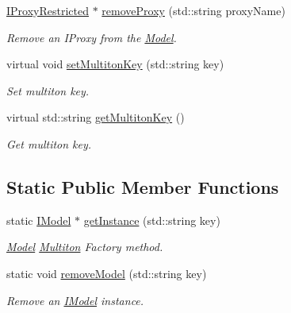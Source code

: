 \begin{DoxyCompactItemize}
\hyperlink{class_pure_m_v_c_1_1_i_proxy_restricted}{IProxyRestricted} $\ast$ \hyperlink{class_pure_m_v_c_1_1_model_a453947b6a8f925304515ac58078f5e57}{removeProxy} (std::string proxyName)
\begin{DoxyCompactList}\small\item\em Remove an {\ttfamily IProxy} from the {\ttfamily \hyperlink{class_pure_m_v_c_1_1_model}{Model}}. \item\end{DoxyCompactList}\item 
virtual void \hyperlink{class_pure_m_v_c_1_1_multiton_key_heir_abc70ef7c066bc8d7bf0196ec727599bb}{setMultitonKey} (std::string key)
\begin{DoxyCompactList}\small\item\em Set multiton key. \item\end{DoxyCompactList}\item 
virtual std::string \hyperlink{class_pure_m_v_c_1_1_multiton_key_heir_aa5622459d33380deb08dc3cab8b991c7}{getMultitonKey} ()
\begin{DoxyCompactList}\small\item\em Get multiton key. \item\end{DoxyCompactList}\end{DoxyCompactItemize}
\subsection*{Static Public Member Functions}
\begin{DoxyCompactItemize}
\item 
static \hyperlink{class_pure_m_v_c_1_1_i_model}{IModel} $\ast$ \hyperlink{class_pure_m_v_c_1_1_model_a3de2966f67f3328abff9a2fc6c96b3e1}{getInstance} (std::string key)
\begin{DoxyCompactList}\small\item\em {\ttfamily \hyperlink{class_pure_m_v_c_1_1_model}{Model}} \hyperlink{class_pure_m_v_c_1_1_multiton}{Multiton} Factory method. \item\end{DoxyCompactList}\item 
static void \hyperlink{class_pure_m_v_c_1_1_model_af815e60f9acb32c0be2a2d5377f39bb7}{removeModel} (std::string key)
\begin{DoxyCompactList}\small\item\em Remove an \hyperlink{class_pure_m_v_c_1_1_i_model}{IModel} instance. \item\end{DoxyCompactList}\end{DoxyCompactItemize}
